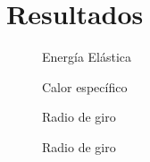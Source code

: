 \chapter{Resultados}

\begin{figure}[h]
\centering
 
\caption{Energía Elástica}
\end{figure}

\begin{figure}[h]
  \centering
  
  \caption{Calor específico}
\end{figure}

\begin{figure}[h]
  \centering
  
  \caption{Radio de giro}
\end{figure}

\begin{figure}[h]
  \centering
  
  \caption{Radio de giro}
\end{figure}

